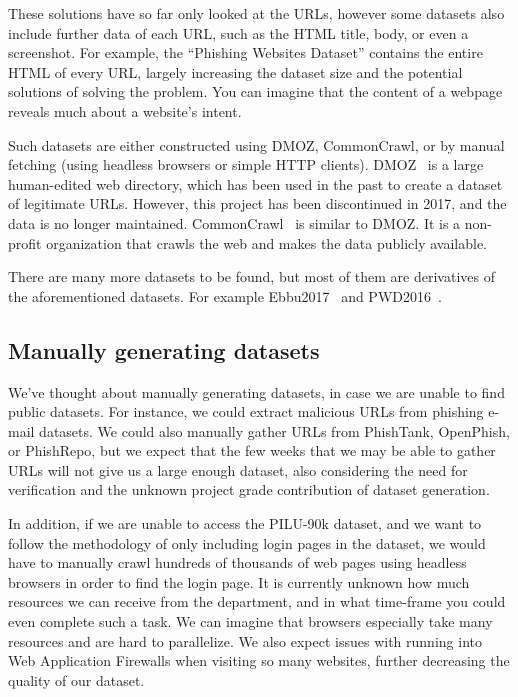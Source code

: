 \documentclass{article}
\begin{document}
    These solutions have so far only looked at the URLs, however some datasets also include further data of each URL, such as the HTML title, body, or even a screenshot.
    For example, the ``Phishing Websites Dataset''\cite{VisualizingRNNInURLDetection} contains the entire HTML of every URL, largely increasing the dataset size and the potential solutions of solving the problem.
    You can imagine that the content of a webpage reveals much about a website's intent.

    Such datasets are either constructed using DMOZ, CommonCrawl, or by manual fetching (using headless browsers\cite{PhishingLoginURLDetection} or simple HTTP clients).%
    DMOZ~\cite{DMOZ} is a large human-edited web directory, which has been used in the past to create a dataset of legitimate URLs. However, this project has been discontinued in 2017, and the data is no longer maintained.
    CommonCrawl~\cite{CommonCrawl} is similar to DMOZ. It is a non-profit organization that crawls the web and makes the data publicly available.

    There are many more datasets to be found, but most of them are derivatives of the aforementioned datasets.
    For example Ebbu2017~\cite{EBBU2017} and PWD2016~\cite{PWD2016}.

    \subsection{Manually generating datasets}\label{subsec:manually-generating-datasets}

    We've thought about manually generating datasets, in case we are unable to find public datasets.
    For instance, we could extract malicious URLs from phishing e-mail datasets.
    We could also manually gather URLs from PhishTank, OpenPhish, or PhishRepo, but we expect that the few weeks that we may be able to gather URLs will not give us a large enough dataset, also considering the need for verification and the unknown project grade contribution of dataset generation.

    In addition, if we are unable to access the PILU-90k dataset, and we want to follow the methodology of only including login pages in the dataset, we would have to manually crawl hundreds of thousands of web pages using headless browsers in order to find the login page.
    It is currently unknown how much resources we can receive from the department, and in what time-frame you could even complete such a task.
    We can imagine that browsers especially take many resources and are hard to parallelize.
    We also expect issues with running into Web Application Firewalls when visiting so many websites, further decreasing the quality of our dataset.
\end{document}

